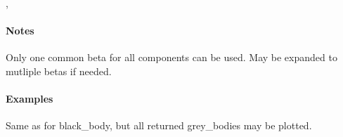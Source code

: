 \documentclass[a4paper,10pt,english]{sphinxmanual}
\begin{document}
\begin{fulllineitems}
\begin{quote}
\begin{description}
\end{description}\end{quote}




{\hyperref[functions:astrolyze.functions.astro_functions.black_body]{}}, {\hyperref[functions:astrolyze.functions.astro_functions.grey_body]{}}


\paragraph{Notes}

Only one common beta for all components can be used. May be expanded to
mutliple betas if needed.
\paragraph{Examples}

Same as for black\_body, but all returned grey\_bodies may be plotted.

\end{fulllineitems}

\end{document}
